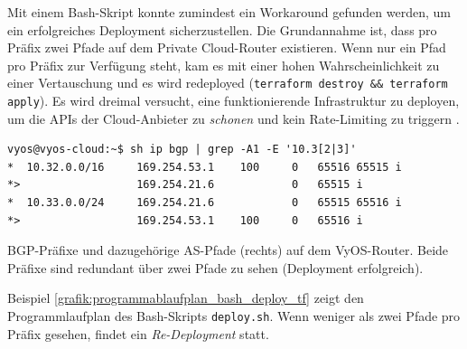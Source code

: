 Mit einem Bash-Skript konnte zumindest ein Workaround gefunden werden, um ein erfolgreiches Deployment sicherzustellen. Die Grundannahme ist, dass pro Präfix zwei Pfade auf dem Private Cloud-Router existieren. Wenn nur ein Pfad pro Präfix zur Verfügung steht, kam es mit einer hohen Wahrscheinlichkeit zu einer Vertauschung und es wird redeployed (\texttt{terraform destroy \&\& terraform apply}). Es wird dreimal versucht, eine funktionierende Infrastruktur zu deployen, um die APIs der Cloud-Anbieter zu \textit{schonen} und kein Rate-Limiting zu triggern \cite{awsthrottling2021}.
\begin{listing}[h]
\begin{verbatim}
vyos@vyos-cloud:~$ sh ip bgp | grep -A1 -E '10.3[2|3]'
*  10.32.0.0/16     169.254.53.1    100     0   65516 65515 i
*>                  169.254.21.6            0   65515 i
*  10.33.0.0/24     169.254.21.6            0   65515 65516 i
*>                  169.254.53.1    100     0   65516 i

\end{verbatim}
\caption{BGP-Präfixe und dazugehörige AS-Pfade (rechts) auf dem VyOS-Router. Beide Präfixe sind redundant über zwei Pfade zu sehen (Deployment erfolgreich).}
\label{bgp-paths-vyos}
\end{listing}
\newpage
Beispiel \ref{grafik:programmablaufplan_bash_deploy_tf} zeigt den Programmlaufplan des Bash-Skripts \texttt{deploy.sh}. Wenn weniger als zwei Pfade pro Präfix gesehen, findet ein \textit{Re-Deployment} statt.

